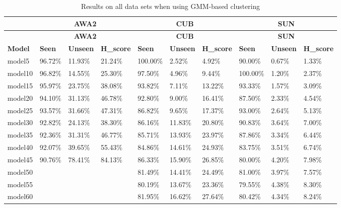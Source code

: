 \begin{longtable}{@{}llllllllll@{}}
\caption{Results on all data sets when using GMM-based clustering}
\label{table:full_results} \\
\toprule
 &
  \multicolumn{3}{c}{\textbf{AWA2}} &
  \multicolumn{3}{c}{\textbf{CUB}} &
  \multicolumn{3}{c}{\textbf{SUN}} \\* \midrule
\endfirsthead

\toprule
 &
  \multicolumn{3}{c}{\textbf{AWA2}} &
  \multicolumn{3}{c}{\textbf{CUB}} &
  \multicolumn{3}{c}{\textbf{SUN}} \\* \midrule
\endhead
%
\bottomrule
\endfoot
%
\endlastfoot
%
\textbf{Model} &
  \textbf{Seen} &
  \textbf{Unseen} &
  \textbf{H\_score} &
  \textbf{Seen} &
  \textbf{Unseen} &
  \textbf{H\_score} &
  \textbf{Seen} &
  \textbf{Unseen} &
  \textbf{H\_score} \\
model5   & 96.72\% & 11.93\% & 21.24\% & 100.00\% & 2.52\%  & 4.92\%  & 90.00\%  & 0.67\%  & 1.33\%  \\
model10  & 96.82\% & 14.55\% & 25.30\% & 97.50\%  & 4.96\%  & 9.44\%  & 100.00\% & 1.20\%  & 2.37\%  \\
model15  & 95.97\% & 23.75\% & 38.08\% & 93.82\%  & 7.11\%  & 13.22\% & 93.33\%  & 1.57\%  & 3.09\%  \\
model20  & 94.10\% & 31.13\% & 46.78\% & 92.80\%  & 9.00\%  & 16.41\% & 87.50\%  & 2.33\%  & 4.54\%  \\
model25  & 93.57\% & 31.66\% & 47.31\% & 86.82\%  & 9.65\%  & 17.37\% & 93.00\%  & 2.64\%  & 5.13\%  \\
model30  & 92.82\% & 24.13\% & 38.30\% & 86.16\%  & 11.83\% & 20.80\% & 90.83\%  & 3.64\%  & 7.00\%  \\
model35  & 92.36\% & 31.31\% & 46.77\% & 85.71\%  & 13.93\% & 23.97\% & 87.86\%  & 3.34\%  & 6.44\%  \\
model40  & 92.07\% & 39.65\% & 55.43\% & 84.86\%  & 14.61\% & 24.93\% & 83.75\%  & 3.51\%  & 6.74\%  \\
model45  & 90.76\% & 78.41\% & 84.13\% & 86.33\%  & 15.90\% & 26.85\% & 80.00\%  & 4.20\%  & 7.98\%  \\
model50  &         &         &         & 81.49\%  & 14.41\% & 24.49\% & 81.00\%  & 3.97\%  & 7.57\%  \\
model55  &         &         &         & 80.19\%  & 13.67\% & 23.36\% & 79.55\%  & 4.38\%  & 8.30\%  \\
model60  &         &         &         & 81.95\%  & 16.62\% & 27.64\% & 80.42\%  & 4.34\%  & 8.24\%  \\

\end{longtable}
